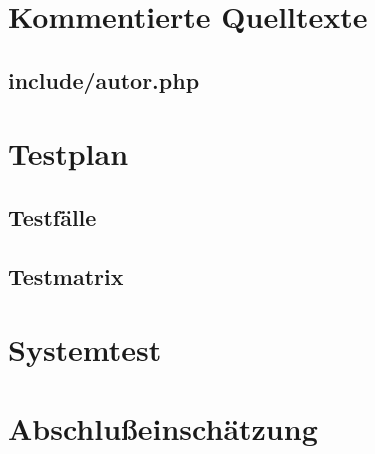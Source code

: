 \section{Kommentierte Quelltexte}
\subsection{include/autor.php}


\section{Testplan}
\subsection{Testfälle}

\subsection{Testmatrix}

\section{Systemtest}

\section{Abschlußeinschätzung}